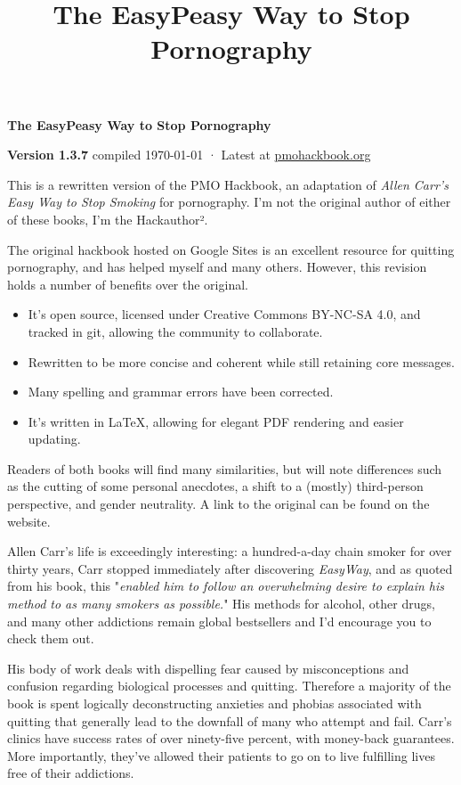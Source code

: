\documentclass[easypeasy.tex]{subfiles}
\title {The EasyPeasy Way to Stop Pornography}
\begin{document}
\thispagestyle{empty}

\begin{center}
  {\Huge\bfseries The EasyPeasy Way to Stop Pornography \par}
  {\small \textbf{Version 1.3.7} compiled {\today} · Latest at \href{https://pmohackbook.org}{pmohackbook.org}}
\end{center}

This is a rewritten version of the PMO Hackbook, an adaptation of \textit{Allen Carr's Easy Way to Stop Smoking} for pornography. I'm not the original author of either of these books, I'm the Hackauthor².

The original hackbook hosted on Google Sites is an excellent resource for quitting pornography, and has helped myself and many others. However, this revision holds a number of benefits over the original.
\begin{itemize}
\item It's open source, licensed under Creative Commons BY-NC-SA 4.0, and tracked in git, allowing the community to collaborate.
\item Rewritten to be more concise and coherent while still retaining core messages.
\item Many spelling and grammar errors have been corrected.
\item It's written in LaTeX, allowing for elegant PDF rendering and easier updating.
\end{itemize}

Readers of both books will find many similarities, but will note differences such as the cutting of some personal anecdotes, a shift to a (mostly) third-person perspective, and gender neutrality. A link to the original can be found on the website.

Allen Carr's life is exceedingly interesting: a hundred-a-day chain smoker for over thirty years, Carr stopped immediately after discovering \textit{EasyWay}, and as quoted from his book, this "\textit{enabled him to follow an overwhelming desire to explain his method to as many smokers as possible.}" His methods for alcohol, other drugs, and many other addictions remain global bestsellers and I'd encourage you to check them out.

His body of work deals with dispelling fear caused by misconceptions and confusion regarding biological processes and quitting. Therefore a majority of the book is spent logically deconstructing anxieties and phobias associated with quitting that generally lead to the downfall of many who attempt and fail. Carr's clinics have success rates of over ninety-five percent, with money-back guarantees. More importantly, they've allowed their patients to go on to live fulfilling lives free of their addictions.
\end{document}
